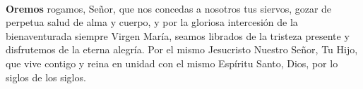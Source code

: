 \ruegapornosotrossalve\\[2mm]
\textbf{Oremos}
 rogamos, Señor, que nos concedas a nosotros tus siervos, gozar de perpetua salud de alma y cuerpo, y por la gloriosa intercesión de la bienaventurada siempre Virgen
María, seamos librados de la tristeza presente y disfrutemos de la eterna alegría. Por el mismo Jesucristo Nuestro Señor, Tu Hijo, que vive contigo y reina en unidad con el mismo Espíritu
Santo, Dios, por lo siglos de los siglos.